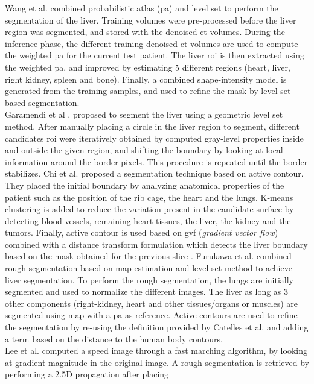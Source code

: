 Wang et al. \cite{Wang2016} combined probabilistic atlas (\ac{pa}) and level set to perform the segmentation of the liver. Training volumes were pre-processed before the liver region was
segmented, and stored with the denoised \ac{ct} volumes. During the inference
phase, the different training denoised \ac{ct} volumes are used to compute
the weighted \ac{pa} for the current test patient. The liver \ac{roi} is then
extracted using the weighted \ac{pa}, and improved by estimating 5 different
regions (heart, liver, right kidney, spleen and bone). Finally, a
combined shape-intensity model is generated from the training samples,
and used to refine the mask by level-set based segmentation.\\
Garamendi et al \cite{Garamendi2007}, proposed to segment the liver using a
geometric level set method. After manually placing a circle in the liver
region to segment, different candidates \ac{roi} were iteratively obtained by
computed gray-level properties inside and outside the given region, and
shifting the boundary by looking at local information around the border
pixels. This procedure is repeated until the border stabilizes.
Chi et al. \cite{Chi2007} proposed a segmentation technique based on active
contour. They placed the initial boundary by analyzing anatomical
properties of the patient such as the position of the rib cage, the
heart and the lungs. K-means clustering is added to reduce the variation
present in the candidate surface by detecting blood vessels, remaining
heart tissues, the liver, the kidney and the tumors. Finally, active
contour is used based on \ac{gvf} (\emph{gradient vector flow}) combined with
a distance transform formulation which detects the liver boundary based on
the mask obtained for the previous slice .
Furukawa et al. \cite{Furukawa2007} combined rough segmentation based on \ac{map} estimation and
level set method to achieve liver segmentation. To perform the rough
segmentation, the lungs are initially segmented and used to normalize
the different images. The liver as long as 3 other components
(right-kidney, heart and other tissues/organs or muscles) are segmented
using \ac{map} with a \ac{pa} as reference. Active contours are used to refine the
segmentation by re-using the definition provided by Catelles et al. and
adding a term based on the distance to the human body contours.\\ 
Lee et al. \cite{Lee2007} computed a speed image through a fast marching algorithm, by
looking at gradient magnitude in the original image. A rough
segmentation is retrieved by performing a 2.5D propagation after placing
